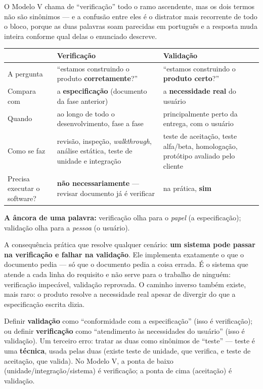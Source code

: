 \begin{conceito}
O Modelo V chama de “verificação” todo o ramo ascendente, mas os dois
termos não são sinônimos --- e a confusão entre eles é o distrator mais
recorrente de todo o bloco, porque as duas palavras soam parecidas em
português e a resposta muda inteira conforme qual delas o enunciado
descreve.

\begin{center}
\begin{tabular}{@{}p{2.6cm}p{4.4cm}p{4.6cm}@{}}
\toprule
& \textbf{Verificação} & \textbf{Validação} \\
\midrule
A pergunta & “estamos construindo o produto \textbf{corretamente}?” &
“estamos construindo o \textbf{produto certo}?” \\
Compara com & a \textbf{especificação} (documento da fase anterior) &
a \textbf{necessidade real} do usuário \\
Quando & ao longo de todo o desenvolvimento, fase a fase & principalmente
perto da entrega, com o usuário \\
Como se faz & revisão, inspeção, \textit{walkthrough}, análise estática,
teste de unidade e integração & teste de aceitação, teste alfa/beta,
homologação, protótipo avaliado pelo cliente \\
Precisa executar o software? & \textbf{não necessariamente} --- revisar
documento já é verificar & na prática, \textbf{sim} \\
\bottomrule
\end{tabular}
\end{center}

\textbf{A âncora de uma palavra:} verificação olha para o \textit{papel} (a
especificação); validação olha para a \textit{pessoa} (o usuário).

A consequência prática que resolve qualquer cenário: \textbf{um sistema pode
passar na verificação e falhar na validação}. Ele implementa exatamente o
que o documento pedia --- só que o documento pedia a coisa errada. É o
sistema que atende a cada linha do requisito e não serve para o trabalho de
ninguém: verificação impecável, validação reprovada. O caminho inverso
também existe, mais raro: o produto resolve a necessidade real apesar de
divergir do que a especificação escrita dizia.
\end{conceito}

\begin{cuidado}
Definir \textbf{validação} como “conformidade com a especificação” (isso é
verificação); ou definir \textbf{verificação} como “atendimento às
necessidades do usuário” (isso é validação). Um terceiro erro: tratar as
duas como sinônimos de “teste” --- teste é uma \textbf{técnica}, usada
pelas duas (existe teste de unidade, que verifica, e teste de aceitação,
que valida). No Modelo V, a ponta de baixo (unidade/integração/sistema) é
verificação; a ponta de cima (aceitação) é validação.
\end{cuidado}

